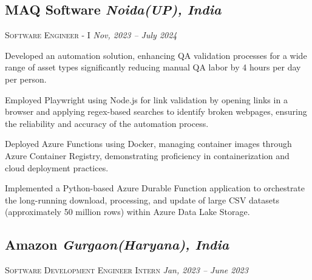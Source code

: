 \documentclass[10pt]{article}
\begin{document}
\subsection*{MAQ Software \hfill \normalsize \normalfont \textit{Noida(UP), India}}
\vspace{-1ex}
\textsc{\textmd{Software Engineer - I}} \hfill \normalsize \textit{Nov, 2023 --  July 2024}
\vspace{-1ex}

\begin{description}
\setlength{\itemindent}{2\parindent}
\item[$\bullet$]{Developed an automation solution, enhancing QA validation processes for a wide range of asset types significantly reducing manual QA labor by 4 hours per day per person.}
\item[$\bullet$]{Employed Playwright using Node.js for link validation by opening links in a browser and applying regex-based searches to identify broken webpages, ensuring the reliability and accuracy of the automation process.}
\item[$\bullet$]{Deployed Azure Functions using Docker, managing container images through Azure Container Registry, demonstrating proficiency in containerization and cloud deployment practices.}
\item[$\bullet$]{Implemented a Python-based Azure Durable Function application to orchestrate the long-running download,
processing, and update of large CSV datasets (approximately 50 million rows) within Azure Data Lake Storage.}
\end{description}


\subsection*{Amazon \hfill \normalsize \normalfont \textit{Gurgaon(Haryana), India}}

\vspace{-1ex}
\textsc{\textmd{Software Development Engineer Intern}} \hfill \normalsize \textit{Jan, 2023 -- June 2023}
\vspace{-1ex}
\end{document}
